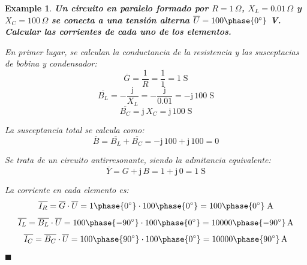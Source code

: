 \documentclass[11pt]{book} %
\numberwithin{dummy}{section}
\theoremstyle{ocrenumbox}
\theoremstyle{blacknumex}
\newtheorem{exampleT}{Example}[chapter]
\theoremstyle{blacknumbox}
\theoremstyle{ocrenum}
\newenvironment{example}{\begin{exampleT}}{\hfill{\tiny\ensuremath{\blacksquare}}\end{exampleT}}
\begin{document}
	\vspace{4mm}
	\begin{example}\label{ej.2-5}
		\textbf{Un circuito en paralelo formado por $R=1\,\Omega$, ${X_L}=0.01\,\Omega$ y ${X_C}=100\,\Omega$ se conecta a una tensión alterna $\overline{U}=100\phase{0^\circ}$ V. Calcular las corrientes de cada uno de los elementos.}
		
		En primer lugar, se calculan la conductancia de la resistencia y las susceptacias de bobina y condensador: 
		\begin{equation*}
			\overline{G}=\dfrac{1}{R}=\dfrac{1}{1}=1\;\text{S}
		\end{equation*}
		\begin{equation*}
			\overline{B_L}=-\dfrac{\mathrm{j}}{X_L}=-\dfrac{\mathrm{j}}{0.01}=-\mathrm{j}\,100\;\text{S}
		\end{equation*}
		\begin{equation*}
			\overline{B_C}=\mathrm{j}\,X_C=\mathrm{j}\,100\;\text{S}
		\end{equation*}
		
		La susceptancia total se calcula como:
		\begin{equation*}
			\overline{B}= \overline{B_L}+\overline{B_C}=-\mathrm{j}\,100+\mathrm{j}\,100=0
		\end{equation*}
		
		Se trata de un circuito antirresonante, siendo la admitancia equivalente:
		\begin{equation*}
			\overline{Y}=G+\mathrm{j}\,B=1+\mathrm{j}\,0=1\;\text{S}
		\end{equation*}
		
		La corriente en cada elemento es:
		\begin{equation*}
			\overline{I_R}=\overline{G}\cdot \overline{U}={1\phase{0^\circ}}\cdot {100\phase{0^\circ}}=100\phase{0^\circ}\;\text{A}
		\end{equation*} 
		\begin{equation*}
			\overline{I_L}=\overline{B_L}\cdot\overline{U}=100\phase{-90^\circ}\cdot 100\phase{0^\circ}=10000\phase{-90^\circ}\,\text{A}
		\end{equation*}
		\begin{equation*}
			\overline{I_C}=\overline{B_C}\cdot\overline{U}=100\phase{90^\circ}\cdot 100\phase{0^\circ}=10000\phase{90^\circ}\,\text{A}
		\end{equation*}
	\end{example}
	
\end{document}
